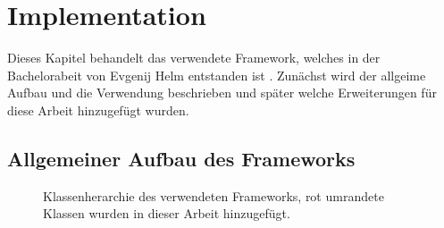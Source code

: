 \documentclass[12pt]{article}
\begin{document}
\section{Implementation}
Dieses Kapitel behandelt das verwendete Framework, welches in der Bachelorabeit von Evgenij Helm entstanden ist \cite{Helm}. Zunächst wird der allgeime Aufbau und die Verwendung beschrieben und später welche Erweiterungen für diese Arbeit hinzugefügt wurden.
\subsection{Allgemeiner Aufbau des Frameworks}
\begin{figure}[H]
	\center
	
	\caption{Klassenherarchie des verwendeten Frameworks, rot umrandete Klassen wurden in dieser Arbeit hinzugefügt.}
	\label{Aufbau}
\end{figure}
\end{document}
